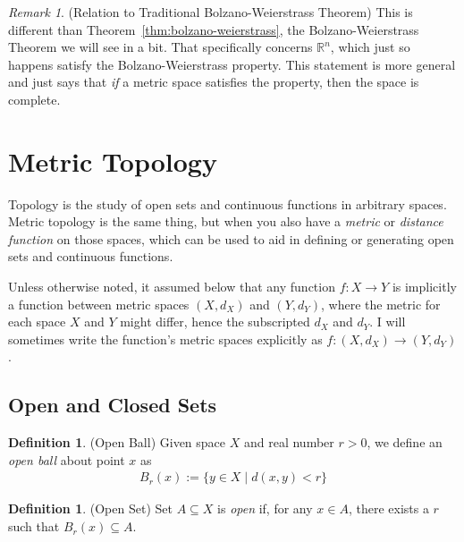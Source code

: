 \documentclass[12pt]{article}
\numberwithin{equation}{section} %
\theoremstyle{plain}
\theoremstyle{definition}
\newtheorem{defn}[thm]{Definition}
\theoremstyle{remark}
\newtheorem*{rmk}{Remark}
\newcommand{\R}{\mathbb{R}}
\begin{document}
\begin{rmk}
(Relation to Traditional Bolzano-Weierstrass Theorem) This is different
than Theorem~\ref{thm:bolzano-weierstrass}, the Bolzano-Weierstrass
Theorem we will see in a bit. That specifically concerns $\R^n$,
which just so happens satisfy the Bolzano-Weierstrass property. This
statement is more general and just says that \emph{if} a metric space
satisfies the property, then the space is complete.
\end{rmk}



\clearpage
\section{Metric Topology}

Topology is the study of open sets and continuous functions in arbitrary
spaces. Metric topology is the same thing, but when you also have a
\emph{metric} or \emph{distance function} on those spaces, which can be
used to aid in defining or generating open sets and continuous
functions.

Unless otherwise noted, it assumed below that any function
$f:X\rightarrow Y$ is implicitly a function between metric spaces
$(X,d_X)$ and $(Y,d_Y)$, where the metric for each space $X$ and $Y$
might differ, hence the subscripted $d_X$ and $d_Y$.
I will sometimes write the function's metric spaces explicitly as
$f:(X,d_X)\rightarrow(Y,d_Y)$.

\subsection{Open and Closed Sets}

\begin{defn}{(Open Ball)}
Given space $X$ and real number $r>0$, we define an \emph{open ball}
about point $x$ as
\begin{align*}
  B_r(x) := \{ y \in X \;|\; d(x,y)<r\}
\end{align*}
\end{defn}

\begin{defn}{(Open Set)}
Set $A\subseteq X$ is \emph{open} if, for any $x\in A$, there exists a
$r$ such that $B_r(x)\subseteq A$.
\end{defn}
\end{document}
